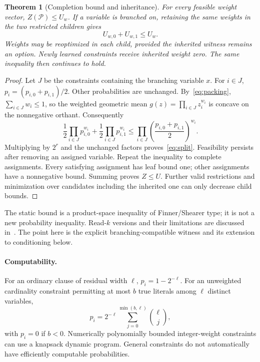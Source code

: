 \documentclass[11pt,a4paper]{article}
\newtheorem{theorem}{Theorem}
\theoremstyle{definition}
\theoremstyle{remark}
\newcommand{\Pcal}{\mathcal P}
\begin{document}
\begin{theorem}[Completion bound and inheritance]\label{thm:packing}
For every feasible weight vector, $Z(\Pcal)\le U_w$. If a variable is
branched on, retaining the same weights in the two restricted children
gives
\begin{equation}
 U_{w,0}+U_{w,1}\le U_w.                             \label{eq:split}
\end{equation}
Weights may be reoptimized in each child, provided the inherited witness
remains an option. Newly learned constraints receive inherited weight zero.
The same inequality then continues to hold.
\end{theorem}
\begin{proof}
Let $J$ be the constraints containing the branching variable $x$.
For $i\in J$, $p_i=(p_{i,0}+p_{i,1})/2$. Other probabilities are unchanged.
By~\eqref{eq:packing}, $\sum_{i\in J}w_i\le1$, so the weighted geometric
mean $g(z)=\prod_{i\in J}z_i^{w_i}$ is concave on the nonnegative orthant.
Consequently
\[
 \frac12\prod_{i\in J}p_{i,0}^{w_i}
 +\frac12\prod_{i\in J}p_{i,1}^{w_i}
 \le\prod_{i\in J}\left(\frac{p_{i,0}+p_{i,1}}2\right)^{w_i}.
\]
Multiplying by $2^r$ and the unchanged factors proves~\eqref{eq:split}.
Feasibility persists after removing an assigned variable. Repeat the
inequality to complete assignments. Every satisfying assignment has leaf
bound one; other assignments have a nonnegative bound. Summing proves
$Z\le U$. Further valid restrictions and minimization over candidates
including the inherited one can only decrease child bounds.
\end{proof}

The static bound is a product-space inequality of Finner/Shearer type;
it is not a new probability inequality. Read-$k$ versions and their
limitations are discussed in~\cite{GLSS}. The point here is the explicit
branching-compatible witness and its extension to conditioning below.

\paragraph{Computability.}
For an ordinary clause of residual width $\ell$,
$p_i=1-2^{-\ell}$. For an unweighted cardinality constraint permitting
at most $b$ true literals among $\ell$ distinct variables,
\[
 p_i=2^{-\ell}\sum_{j=0}^{\min(b,\ell)}\binom\ell j,
\]
with $p_i=0$ if $b<0$. Numerically polynomially bounded integer-weight
constraints can use a knapsack dynamic program. General constraints do
not automatically have efficiently computable probabilities.
\end{document}
